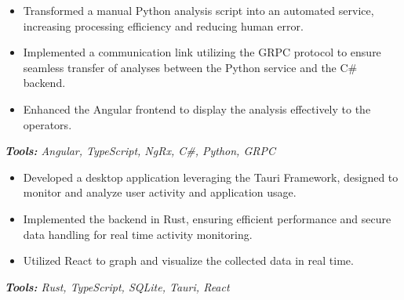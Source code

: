 \documentclass[10pt,letter]{altacv}
\begin{document}
\divider

\begin{itemize}
  \item Transformed a manual Python analysis script into an automated service, increasing processing efficiency and reducing human error.
  \item Implemented a communication link utilizing the GRPC protocol to ensure seamless transfer of analyses between the Python service and the C\# backend.
  \item Enhanced the Angular frontend to display the analysis effectively to the operators.
\end{itemize}
\textit{\textbf{Tools:} Angular, TypeScript, NgRx,  C\#, Python, GRPC}

\medskip



\begin{itemize}
  \item Developed a desktop application leveraging the Tauri Framework, designed to monitor and analyze user activity and application usage.
  \item Implemented the backend in Rust, ensuring efficient performance and secure data handling for real time activity monitoring.
  \item Utilized React to graph and visualize the collected data in real time.
\end{itemize}
\textit{\textbf{Tools:} Rust, TypeScript, SQLite, Tauri, React}

\divider
\end{document}
